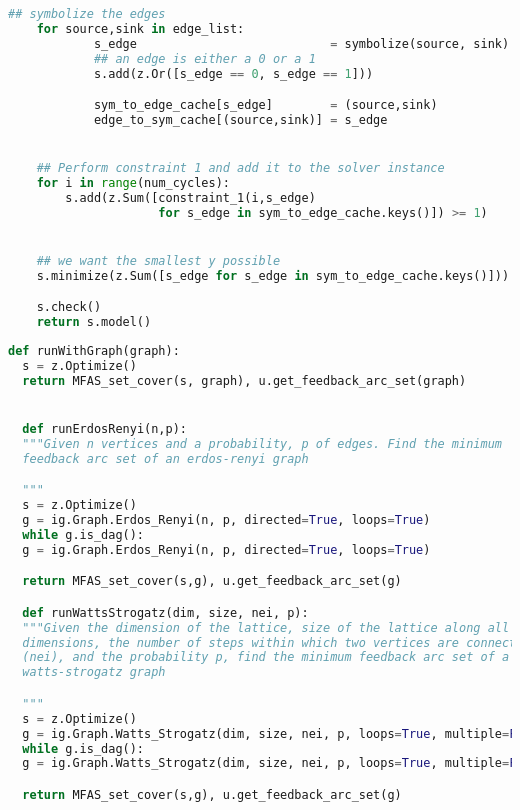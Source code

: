 \begin{lstlisting}[language=python]
    ## symbolize the edges
    for source,sink in edge_list:
            s_edge                           = symbolize(source, sink)
            ## an edge is either a 0 or a 1
            s.add(z.Or([s_edge == 0, s_edge == 1]))

            sym_to_edge_cache[s_edge]        = (source,sink)
            edge_to_sym_cache[(source,sink)] = s_edge


    ## Perform constraint 1 and add it to the solver instance
    for i in range(num_cycles):
        s.add(z.Sum([constraint_1(i,s_edge)
                     for s_edge in sym_to_edge_cache.keys()]) >= 1)


    ## we want the smallest y possible
    s.minimize(z.Sum([s_edge for s_edge in sym_to_edge_cache.keys()]))

    s.check()
    return s.model()
\end{lstlisting}


\newpage
\begin{lstlisting}[language=python]
  def runWithGraph(graph):
  s = z.Optimize()
  return MFAS_set_cover(s, graph), u.get_feedback_arc_set(graph)


  def runErdosRenyi(n,p):
  """Given n vertices and a probability, p of edges. Find the minimum
  feedback arc set of an erdos-renyi graph

  """
  s = z.Optimize()
  g = ig.Graph.Erdos_Renyi(n, p, directed=True, loops=True)
  while g.is_dag():
  g = ig.Graph.Erdos_Renyi(n, p, directed=True, loops=True)

  return MFAS_set_cover(s,g), u.get_feedback_arc_set(g)

  def runWattsStrogatz(dim, size, nei, p):
  """Given the dimension of the lattice, size of the lattice along all
  dimensions, the number of steps within which two vertices are connected
  (nei), and the probability p, find the minimum feedback arc set of a
  watts-strogatz graph

  """
  s = z.Optimize()
  g = ig.Graph.Watts_Strogatz(dim, size, nei, p, loops=True, multiple=False)
  while g.is_dag():
  g = ig.Graph.Watts_Strogatz(dim, size, nei, p, loops=True, multiple=False)

  return MFAS_set_cover(s,g), u.get_feedback_arc_set(g)
\end{lstlisting}

